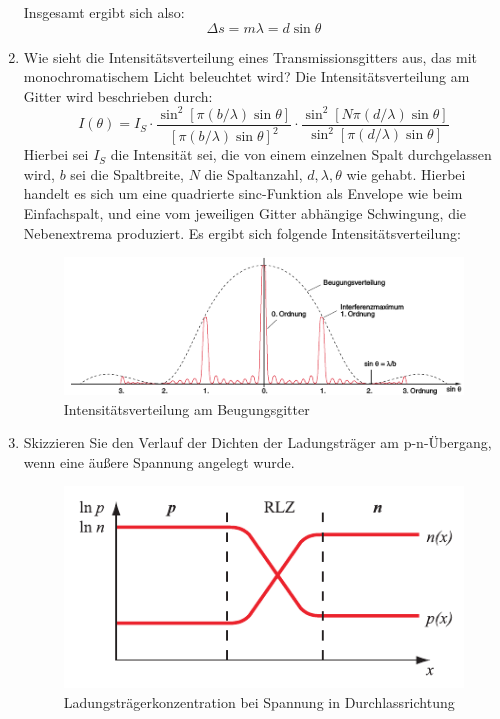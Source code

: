 \begin{enumerate}
		Insgesamt ergibt sich also:
		\begin{displaymath}
			\Delta s=m\lambda=d\sin\theta
		\end{displaymath}
	\pagebreak
	\item Wie sieht die Intensitätsverteilung eines Transmissionsgitters aus, das mit monochromatischem Licht beleuchtet wird?
		\subitem Die Intensitätsverteilung am Gitter wird beschrieben durch:
		\begin{displaymath}
			I(\theta)=I_S\cdot\frac{\sin^2[\pi(b/\lambda)\sin\theta]}{[\pi(b/\lambda)\sin\theta]^2}\cdot\frac{\sin^2[N\pi(d/\lambda)\sin\theta]}{\sin^2[\pi(d/\lambda)\sin\theta]}
		\end{displaymath}
		Hierbei sei $I_S$ die Intensität sei, die von einem einzelnen Spalt durchgelassen wird, $b$ sei die Spaltbreite, $N$ die Spaltanzahl, $d,\lambda,\theta$ wie gehabt. 
		Hierbei handelt es sich um eine quadrierte sinc-Funktion als Envelope wie beim Einfachspalt, und eine vom jeweiligen Gitter abhängige Schwingung, die Nebenextrema produziert. Es ergibt sich folgende Intensitätsverteilung:
		\begin{figure}[!h]
			\centering
			\includegraphics[]{intensitaet}
			\caption{Intensitätsverteilung am Beugungsgitter}
			\label{fig:Abb2}
		\end{figure}
	\item Skizzieren Sie den Verlauf der Dichten der Ladungsträger am p-n-Übergang, wenn eine äußere Spannung angelegt wurde.
		\subitem \begin{figure}[!h]
			\centering
			\includegraphics[]{pn}
			\caption{Ladungsträgerkonzentration bei Spannung in Durchlassrichtung}
			\label{fig:Abb3}
		\end{figure}
\end{enumerate}
